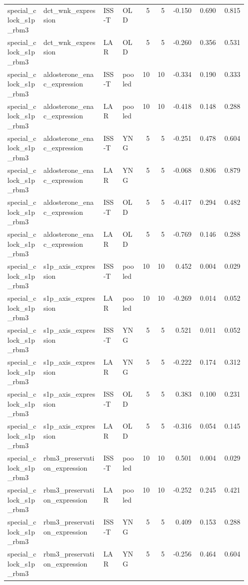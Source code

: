 \documentclass[11pt]{article}
\begin{document}
\begin{landscape}
\begin{longtable}{p{0.15\linewidth}p{0.25\linewidth}p{0.08\linewidth}p{0.08\linewidth}rrrrr}
special\_clock\_s1p\_rbm3 & dct\_wnk\_expression & ISS-T & OLD & 5 & 5 & -0.150 & 0.690 & 0.815 \\
special\_clock\_s1p\_rbm3 & dct\_wnk\_expression & LAR & OLD & 5 & 5 & -0.260 & 0.356 & 0.531 \\
special\_clock\_s1p\_rbm3 & aldosterone\_enac\_expression & ISS-T & pooled & 10 & 10 & -0.334 & 0.190 & 0.333 \\
special\_clock\_s1p\_rbm3 & aldosterone\_enac\_expression & LAR & pooled & 10 & 10 & -0.418 & 0.148 & 0.288 \\
special\_clock\_s1p\_rbm3 & aldosterone\_enac\_expression & ISS-T & YNG & 5 & 5 & -0.251 & 0.478 & 0.604 \\
special\_clock\_s1p\_rbm3 & aldosterone\_enac\_expression & LAR & YNG & 5 & 5 & -0.068 & 0.806 & 0.879 \\
special\_clock\_s1p\_rbm3 & aldosterone\_enac\_expression & ISS-T & OLD & 5 & 5 & -0.417 & 0.294 & 0.482 \\
special\_clock\_s1p\_rbm3 & aldosterone\_enac\_expression & LAR & OLD & 5 & 5 & -0.769 & 0.146 & 0.288 \\
special\_clock\_s1p\_rbm3 & s1p\_axis\_expression & ISS-T & pooled & 10 & 10 & 0.452 & 0.004 & 0.029 \\
special\_clock\_s1p\_rbm3 & s1p\_axis\_expression & LAR & pooled & 10 & 10 & -0.269 & 0.014 & 0.052 \\
special\_clock\_s1p\_rbm3 & s1p\_axis\_expression & ISS-T & YNG & 5 & 5 & 0.521 & 0.011 & 0.052 \\
special\_clock\_s1p\_rbm3 & s1p\_axis\_expression & LAR & YNG & 5 & 5 & -0.222 & 0.174 & 0.312 \\
special\_clock\_s1p\_rbm3 & s1p\_axis\_expression & ISS-T & OLD & 5 & 5 & 0.383 & 0.100 & 0.231 \\
special\_clock\_s1p\_rbm3 & s1p\_axis\_expression & LAR & OLD & 5 & 5 & -0.316 & 0.054 & 0.145 \\
special\_clock\_s1p\_rbm3 & rbm3\_preservation\_expression & ISS-T & pooled & 10 & 10 & 0.501 & 0.004 & 0.029 \\
special\_clock\_s1p\_rbm3 & rbm3\_preservation\_expression & LAR & pooled & 10 & 10 & -0.252 & 0.245 & 0.421 \\
special\_clock\_s1p\_rbm3 & rbm3\_preservation\_expression & ISS-T & YNG & 5 & 5 & 0.409 & 0.153 & 0.288 \\
special\_clock\_s1p\_rbm3 & rbm3\_preservation\_expression & LAR & YNG & 5 & 5 & -0.256 & 0.464 & 0.604 \\

\end{longtable}
\end{landscape}
\end{document}
